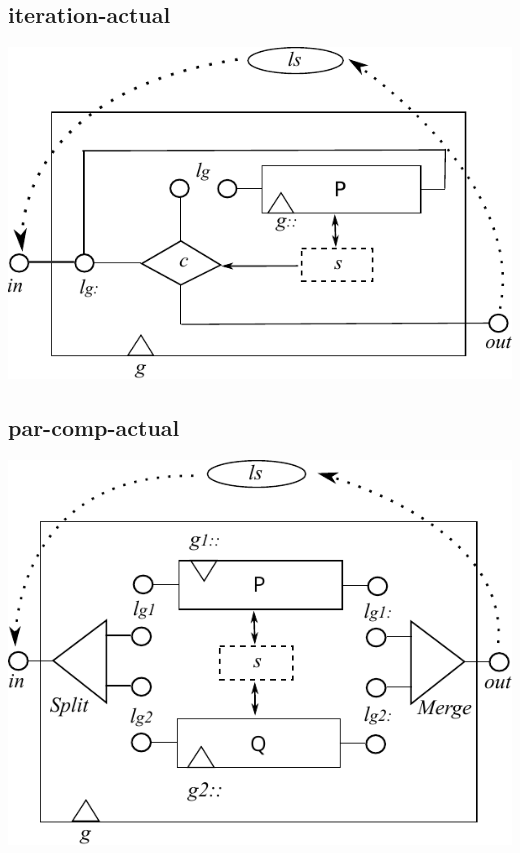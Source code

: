 \subsection{iteration-actual}
\includegraphics{images/iteration-actual}

\subsection{par-comp-actual}
\includegraphics{images/par-comp-actual}

